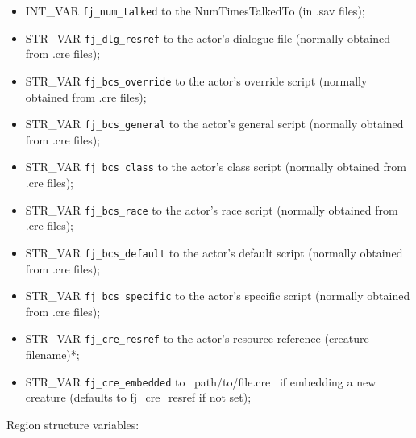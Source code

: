 \documentclass{article}
\begin{document}
\begin{itemize}
\item INT_VAR \verb+fj_num_talked+ to the NumTimesTalkedTo (in .sav files);
\item STR_VAR \verb+fj_dlg_resref+ to the actor's dialogue file (normally obtained from .cre files);
\item STR_VAR \verb+fj_bcs_override+ to the actor's override script (normally obtained from .cre files);
\item STR_VAR \verb+fj_bcs_general+ to the actor's general script (normally obtained from .cre files);
\item STR_VAR \verb+fj_bcs_class+ to the actor's class script (normally obtained from .cre files);
\item STR_VAR \verb+fj_bcs_race+ to the actor's race script (normally obtained from .cre files);
\item STR_VAR \verb+fj_bcs_default+ to the actor's default script (normally obtained from .cre files);
\item STR_VAR \verb+fj_bcs_specific+ to the actor's specific script (normally obtained from .cre files);
\item STR_VAR \verb+fj_cre_resref+ to the actor's resource reference (creature filename)*;
\item STR_VAR \verb+fj_cre_embedded+ to ~path/to/file.cre~ if embedding a new creature (defaults to fj_cre_resref if not set);
\end{itemize}
Region structure variables:
\end{document}
